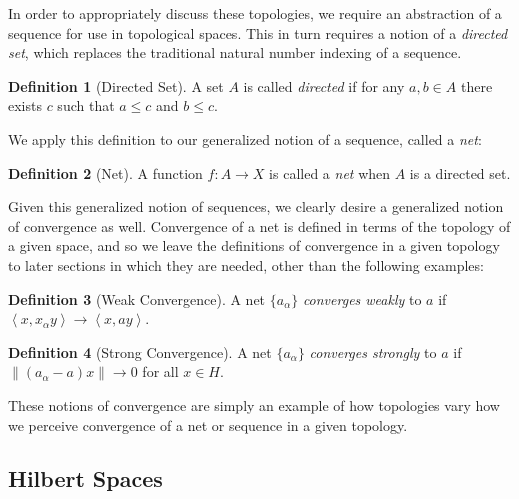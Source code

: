 \documentclass{article}
\theoremstyle{plain}
\theoremstyle{definition}
\newtheorem{definition}{Definition}
\newcommand{\inner}[2]{\left\langle #1, #2 \right\rangle}
\newcommand{\norm}[1]{\left\lVert #1 \right\rVert}
\begin{document}
                In order to appropriately discuss these topologies, we require an abstraction of a sequence for use in topological spaces.
                This in turn requires a notion of a \textit{directed set}, which replaces the traditional natural number indexing of a sequence.
                \begin{definition}[Directed Set] \label{def:directed set}
                        A set $A$ is called \textit{directed} if for any $a, b \in A$ there exists $c$ such that $a \leq c$ and $b \leq c$.
                \end{definition}
                We apply this definition to our generalized notion of a sequence, called a \textit{net}:
                \begin{definition}[Net] \label{def:net}
                        A function $f : A \to X$ is called a \textit{net} when $A$ is a directed set.
                \end{definition}
                Given this generalized notion of sequences, we clearly desire a generalized notion of convergence as well.
                Convergence of a net is defined in terms of the topology of a given space, and so we leave the definitions of convergence in a given topology to later sections in which they are needed, other than the following examples:
                \begin{definition}[Weak Convergence] \label{def:weak convergence}
                        A net $\{a_\alpha\}$ \textit{converges weakly} to $a$ if $\inner{x}{x_\alpha y} \to \inner{x}{ay}$.
                \end{definition}

                \begin{definition}[Strong Convergence] \label{def:strong convergence}
                        A net $\{a_\alpha\}$ \textit{converges strongly} to $a$ if $\norm{(a_\alpha - a)x} \to 0$ for all $x \in H$.
                \end{definition}

                These notions of convergence are simply an example of how topologies vary how we perceive convergence of a net or sequence in a given topology.

        \subsection{Hilbert Spaces} \label{subsec:hilbert}
                
\end{document}
